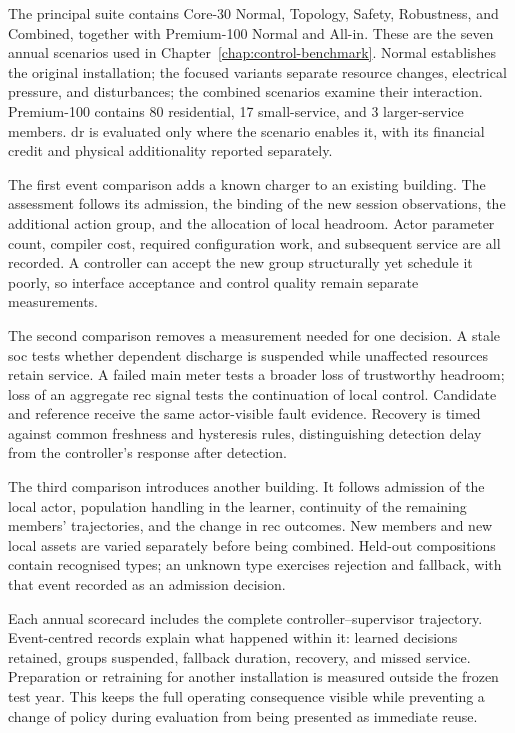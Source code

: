 The principal suite contains Core-30 Normal, Topology, Safety, Robustness, and Combined, together with Premium-100 Normal and All-in. These are the seven annual scenarios used in Chapter~\ref{chap:control-benchmark}. Normal establishes the original installation; the focused variants separate resource changes, electrical pressure, and disturbances; the combined scenarios examine their interaction. Premium-100 contains 80 residential, 17 small-service, and 3 larger-service members. \gls{dr} is evaluated only where the scenario enables it, with its financial credit and physical additionality reported separately.

The first event comparison adds a known charger to an existing building. The assessment follows its admission, the binding of the new session observations, the additional action group, and the allocation of local headroom. Actor parameter count, compiler cost, required configuration work, and subsequent service are all recorded. A controller can accept the new group structurally yet schedule it poorly, so interface acceptance and control quality remain separate measurements.

The second comparison removes a measurement needed for one decision. A stale \gls{soc} tests whether dependent discharge is suspended while unaffected resources retain service. A failed main meter tests a broader loss of trustworthy headroom; loss of an aggregate \gls{rec} signal tests the continuation of local control. Candidate and reference receive the same actor-visible fault evidence. Recovery is timed against common freshness and hysteresis rules, distinguishing detection delay from the controller's response after detection.

The third comparison introduces another building. It follows admission of the local actor, population handling in the learner, continuity of the remaining members' trajectories, and the change in \gls{rec} outcomes. New members and new local assets are varied separately before being combined. Held-out compositions contain recognised types; an unknown type exercises rejection and fallback, with that event recorded as an admission decision.

Each annual scorecard includes the complete controller--supervisor trajectory. Event-centred records explain what happened within it: learned decisions retained, groups suspended, fallback duration, recovery, and missed service. Preparation or retraining for another installation is measured outside the frozen test year. This keeps the full operating consequence visible while preventing a change of policy during evaluation from being presented as immediate reuse.

